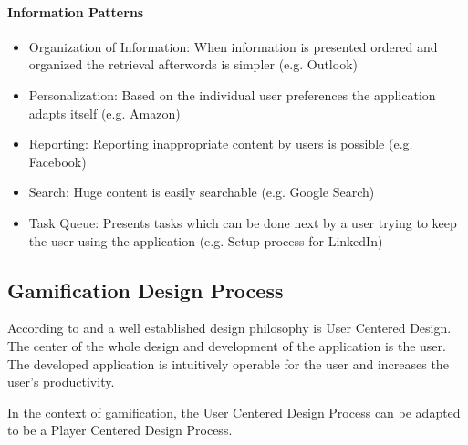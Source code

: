 \paragraph*{Information Patterns}
\begin{itemize}
	\item Organization of Information: When information is presented ordered and organized the retrieval afterwords is simpler (e.g. Outlook) \cite[p. 6, 85, 86]{lewisIrresistibleAppsMotivational2014}
	\item Personalization: Based on the individual user preferences the application adapts itself (e.g. Amazon) \cite[p. 6, 87]{lewisIrresistibleAppsMotivational2014}
	\item Reporting: Reporting inappropriate content by users is possible (e.g. Facebook) \cite[p. 6, 90]{lewisIrresistibleAppsMotivational2014}
	\item Search: Huge content is easily searchable (e.g. Google Search) \cite[p. 6, 90, 91]{lewisIrresistibleAppsMotivational2014}
	\item Task Queue: Presents tasks which can be done next by a user trying to keep the user using the application (e.g. Setup process for LinkedIn) \cite[p. 6, 93]{lewisIrresistibleAppsMotivational2014}
\end{itemize}

\newpage

\subsection{Gamification Design Process}
\label{sec:theoryBd}

According to \cite[p. 5, 6]{lowdermilkUsercenteredDesignDevelopers2013} and \cite[p. 27, 28]{kumarGamificationWorkDesigning2013} a well established design philosophy is User Centered Design. The center of the whole design and development of the application is the user. The developed application is intuitively operable for the user and increases the user's productivity.

In the context of gamification, the User Centered Design Process can be adapted to be a Player Centered Design Process.  

